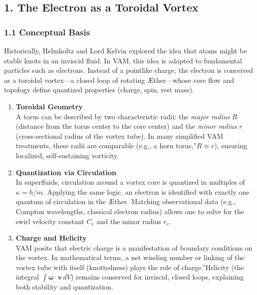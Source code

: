 \documentclass[a4paper,12pt]{article}
\begin{document}
\subsection*{1. The Electron as a Toroidal Vortex}

\subsubsection*{1.1 Conceptual Basis}
Historically, Helmholtz and Lord Kelvin explored the idea that atoms might be stable knots in an inviscid fluid. In VAM, this idea is adapted to fundamental particles such as electrons. Instead of a pointlike charge, the electron is conceived as a toroidal vortex—a closed loop of rotating Æther—whose core flow and topology define quantized properties (charge, spin, rest mass).

\begin{enumerate}
    \item \textbf{Toroidal Geometry} \\
    A torus can be described by two characteristic radii: the \textit{major radius} \(R\) (distance from the torus center to the core center) and the \textit{minor radius} \(r\) (cross-sectional radius of the vortex tube). In many simplified VAM treatments, these radii are comparable (e.g., a \grqq horn torus,\textquotedblright \(R \approx r\)), ensuring localized, self-sustaining vorticity.

    \item \textbf{Quantization via Circulation} \\
    In superfluids, circulation around a vortex core is quantized in multiples of \(\kappa = h/m\). Applying the same logic, an electron is identified with exactly one quantum of circulation in the Æther. Matching observational data (e.g., Compton wavelengths, classical electron radius) allows one to solve for the swirl velocity constant \(C_e\) and the minor radius \(r_c\).

    \item \textbf{Charge and Helicity} \\
    VAM posits that electric charge is a manifestation of boundary conditions on the vortex. In mathematical terms, a net winding number or linking of the vortex tube with itself (knottedness) plays the role of \grqq charge.\textquotedblright Helicity (the integral \(\int \boldsymbol{\omega}\cdot \mathbf{v}\, dV\)) remains conserved for inviscid, closed loops, explaining both stability and quantization.
\end{enumerate}
\end{document}
